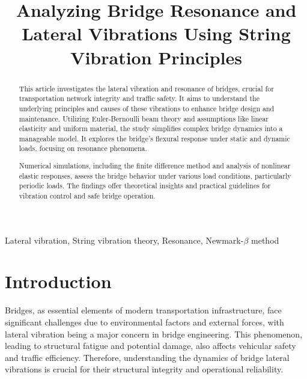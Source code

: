 \documentclass[conference]{IEEEtran}
\begin{document}
\title{\LARGE Analyzing Bridge Resonance and Lateral Vibrations Using String Vibration Principles}

 \author{
 }

\maketitle

\begin{abstract}

This article investigates the lateral vibration and resonance of bridges, crucial for transportation network integrity and traffic safety. It aims to understand the underlying principles and causes of these vibrations to enhance bridge design and maintenance. Utilizing Euler-Bernoulli beam theory and assumptions like linear elasticity and uniform material, the study simplifies complex bridge dynamics into a manageable model. It explores the bridge's flexural response under static and dynamic loads, focusing on resonance phenomena.

Numerical simulations, including the finite difference method and analysis of nonlinear elastic responses, assess the bridge behavior under various load conditions, particularly periodic loads. The findings offer theoretical insights and practical guidelines for vibration control and safe bridge operation.
\end{abstract}

\IEEEoverridecommandlockouts
\begin{keywords}
Lateral vibration, String vibration theory, Resonance, Newmark-$\beta{}$ method
\end{keywords}

\IEEEpeerreviewmaketitle




\section{Introduction}
Bridges, as essential elements of modern transportation infrastructure, face significant challenges due to environmental factors and external forces, with lateral vibration being a major concern in bridge engineering. This phenomenon, leading to structural fatigue and potential damage, also affects vehicular safety and traffic efficiency. Therefore, understanding the dynamics of bridge lateral vibrations is crucial for their structural integrity and operational reliability\cite{chen2020multimode}\cite{wei2022lateral}.
\end{document}
